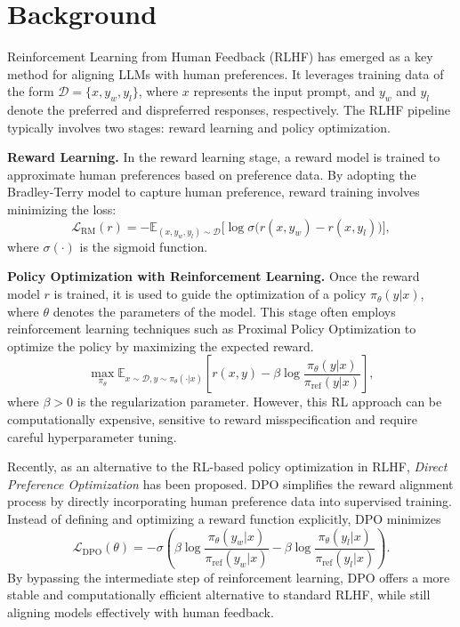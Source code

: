 \section{Background}


Reinforcement Learning from Human Feedback (RLHF) has emerged as a key method for aligning LLMs with human preferences. It leverages training data of the form $\mathcal{D} = \{x, y_w, y_l\}$, where $x$ represents the input prompt, and $y_w$ and $y_l$ denote the preferred and dispreferred responses, respectively. The RLHF pipeline typically involves two stages: reward learning and policy optimization.

\textbf{Reward Learning.} In the reward learning stage, a reward model is trained to approximate human preferences based on preference data. By adopting the Bradley-Terry model \citep{bradley1952rank} to capture human preference, reward training involves minimizing the loss:
$$
\mathcal{L}_{\mathrm{RM}}(r) = - \mathbb{E}_{(x, y_w, y_l) \sim \mathcal{D}}\big[ \log \sigma\big(r(x, y_w) - r(x, y_l)\big) \big],
$$
where $\sigma(\cdot)$ is the sigmoid function. 

\textbf{Policy Optimization with Reinforcement Learning.} Once the reward model $r$ is trained, it is used to guide the optimization of a policy $\pi_\theta(y|x)$, where $\theta$ denotes the parameters of the model. This stage often employs reinforcement learning techniques such as Proximal Policy Optimization \citep[PPO;][]{schulman2017proximal} to optimize the policy by maximizing the expected reward. 
$$
\max_{\pi_\theta} \mathbb{E}_{x \sim \mathcal{D}, y \sim \pi_\theta(\cdot|x)} \left[r(x, y) - \beta \log \frac{\pi_\theta(y|x)}{\pi_{\mathrm{ref}}(y|x)} \right],
$$
where $\beta > 0$ is the regularization parameter.
However, this RL approach can be computationally expensive, sensitive to reward misspecification and require careful hyperparameter tuning.

Recently, as an alternative to the RL-based policy optimization in RLHF, \emph{Direct Preference Optimization} \citep[DPO;][]{rafailov2024direct} has been proposed. DPO simplifies the reward alignment process by directly incorporating human preference data into supervised training. Instead of defining and optimizing a reward function explicitly, DPO minimizes
$$
\mathcal{L}_{\mathrm{DPO}}(\theta) = - \sigma\left(\beta \log \frac{\pi_\theta(y_w|x)}{\pi_{\mathrm{ref}}(y_w|x)} - \beta \log \frac{\pi_\theta(y_l|x)}{\pi_{\mathrm{ref}}(y_l|x)} \right).
$$
By bypassing the intermediate step of reinforcement learning, DPO offers a more stable and computationally efficient alternative to standard RLHF, while still aligning models effectively with human feedback.



